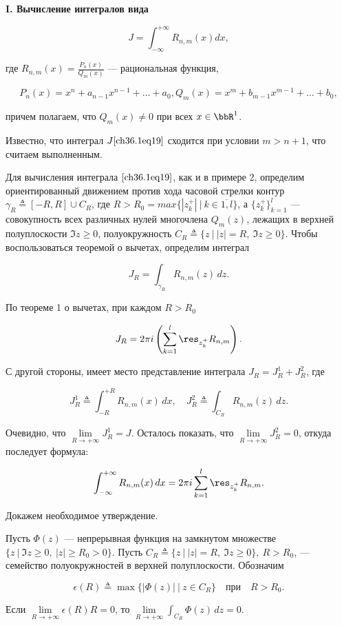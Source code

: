{\bf I. Вычисление интегралов вида}

\begin{equation} \label{ch36.1eq19}
J = \int_{-\infty}^{+\infty} R_{n,m} (x) dx,
\end{equation}

где $R_{n,m}(x) = \frac{P_n(x)}{Q_m(x)}$ --- рациональная функция,

$$
P_n(x) = x^n + a_{n - 1} x^{n - 1} + \ldots + a_0,
Q_m(x) = x^m + b_{m - 1} x^{m - 1} + \ldots + b_0,
$$

причем полагаем, что $Q_m(x) \not= 0$ при всех $x \in \bbR^1$.

Известно, что интеграл $J \eqref{ch36.1eq19}$ сходится при условии $m > n + 1$, что считаем выполненным.

Для вычисления интеграла $\eqref{ch36.1eq19}$, как и в примере 2, определим ориентированный движением против хода часовой стрелки контур $\gamma_R \triangleq [-R, R] \cup C_R$, где $R > R_0 = max\{ |z_k^{+}| \: \big| \: k \in \overline{1,l} \}$, а $ \{ z_{k}^{+} \}^l_{k = 1}$ --- совокупность всех различных нулей многочлена $Q_m(z)$, лежащих в верхней полуплоскости $\Im z \ge 0$, полуокружность $C_R \triangleq \{ z \: \big| \: |z| = R, \: \Im z \ge 0 \}$. Чтобы воспользоваться теоремой о вычетах, определим интеграл 

$$
J_R = \int_{\gamma_R} R_{n,m}(z)\,dz.
$$

По теореме 1 о вычетах, при каждом $R > R_0$

$$
J_R = 2\pi i\left( \sum_{k = 1}^{l} \res_{z_k^+} R_{n,m}\right).
$$

С другой стороны, имеет место представление интеграла $J_R = J_R^1 + J_R^2$, где 

\begin{equation} \label{ch36.1eq20}
J_R^1 \triangleq \int_{-R}^{+R} R_{n,m}(x)\,dx, \quad J_R^2 \triangleq \int_{C_R} R_{n,m}(z)\,dz.
\end{equation}

Очевидно, что $\lim\limits_{R \to +\infty} J_R^1 = J$. Осталось показать, что $\lim\limits_{R \to +\infty}J_R^2 = 0$, откуда последует формула:

\begin{equation} \label{ch36.1eq21}
\int_{-\infty}^{+\infty}R_{n,m}(x)\,dx = 2\pi i\sum_{k = 1}^{l} \res_{z_k^+} R_{n,m}.
\end{equation}

Докажем необходимое утверждение.

\begin{lemm} \label{ch36.1lemm4}
Пусть $\Phi(z)$ --- непрерывная функция на замкнутом множестве $\{ z \: \big| \: \Im z \ge 0, \: |z| \ge R_0 > 0 \}$. Пусть $C_R \triangleq \{ z \: \big| \: |z| = R, \: \Im z \ge 0 \}, \: R > R_0$, --- семейство полуокружностей в верхней полуплоскости. Обозначим

$$
\epsilon(R) \triangleq \max\{|\Phi(z)| \: \big| \: z\in C_R \} \quad \text{при} \quad R > R_0.
$$

Если $\lim\limits_{R \to +\infty} \epsilon(R)R = 0$, то $\lim\limits_{R \to +\infty} \int_{C_R} \Phi(z)\,dz = 0$.
\end{lemm}

